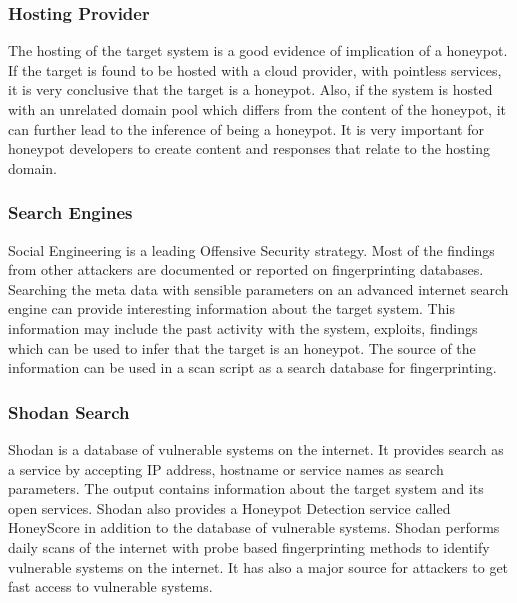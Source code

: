 \documentclass[../main.tex]{subfiles}
\begin{document}
\subsubsection{Hosting Provider}
The hosting of the target system is a good evidence of implication of a honeypot. If the target is found to be hosted with a cloud provider, with pointless services, it is very conclusive that the target is a honeypot. Also, if the system is hosted with an unrelated domain pool which differs from the content of the honeypot, it can further lead to the inference of being a honeypot. It is very important for honeypot developers to create content and responses that relate to the hosting domain.  
\newline
\subsubsection{Search Engines}
Social Engineering is a leading Offensive Security strategy. Most of the findings from other attackers are documented or reported on fingerprinting databases. Searching the meta data with sensible parameters on an advanced internet search engine can provide interesting information about the target system. This information may include the past activity with the system, exploits, findings which can be used to infer that the target is an honeypot. The source of the information can be used in a scan script as a search database for fingerprinting. 
\newline
\subsubsection{Shodan Search}
Shodan is a database of vulnerable systems on the internet. It provides search as a service by accepting IP address, hostname or service names as search parameters. The output contains information about the target system and its open services. Shodan also provides a Honeypot Detection service called HoneyScore \cite{SHODAN} in addition to the database of vulnerable systems. Shodan performs daily scans of the internet with probe based fingerprinting methods to identify vulnerable systems on the internet. It has also a major source for attackers to get fast access to vulnerable systems. 
\newline
\end{document}
